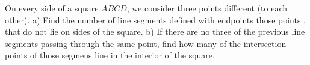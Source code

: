 On every side of  a square $ABCD$, we consider three points different (to each other).
a) Find the number of line segments defined with endpoints those points , that do not lie on sides of the square.
b) If there are no three of the previous line segments passing through the same point, find how many of the intersection points of those segmens line in the interior of the square.